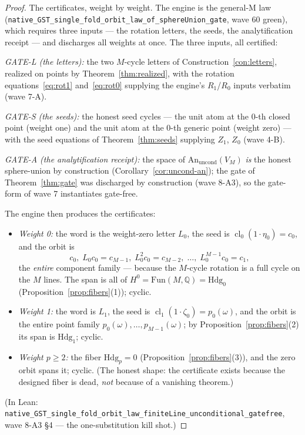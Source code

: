 \documentclass[11pt,a4paper]{article}
\theoremstyle{plain}
\theoremstyle{definition}
\newcommand{\Q}{\mathbb{Q}}
\newcommand{\cl}{\operatorname{cl}}
\begin{document}
\begin{proof}
The certificates, weight by weight.  The engine is the general-M law
(\texttt{native\_GST\_single\_fold\_orbit\_law\_of\_sphereUnion\_gate},
wave 60 green), which requires three inputs --- the rotation letters,
the seeds, the analytification receipt --- and discharges all weights
at once.  The three inputs, all certified:

\emph{GATE-L (the letters):} the two $M$-cycle letters of
Construction~\ref{con:letters}, realized on points by
Theorem~\ref{thm:realized}, with the rotation
equations~\eqref{eq:rot1} and~\eqref{eq:rot0} supplying the engine's
$R_1$/$R_0$ inputs verbatim (wave 7-A).

\emph{GATE-S (the seeds):} the honest seed cycles --- the unit atom
at the $0$-th closed point (weight one) and the unit atom at the
$0$-th generic point (weight zero) --- with the seed equations of
Theorem~\ref{thm:seeds} supplying $Z_1$, $Z_0$ (wave 4-B).

\emph{GATE-A (the analytification receipt):} the space of
$\mathrm{An}_{\mathrm{uncond}}(V_M)$ \emph{is} the honest
sphere-union by construction (Corollary~\ref{cor:uncond-an}); the
gate of Theorem~\ref{thm:gate} was discharged by construction (wave
8-A3), so the gate-form of wave 7 instantiates gate-free.

The engine then produces the certificates:
\begin{itemize}
\item \emph{Weight 0:} the word is the weight-zero letter $L_0$, the
seed is $\cl_0(1\cdot\eta_0) = c_0$, and the orbit is
\[
c_0,\; L_0 c_0 = c_{M-1},\; L_0^2 c_0 = c_{M-2},\;\dots,\;
L_0^{M-1} c_0 = c_1,
\]
the \emph{entire} component family --- because the $M$-cycle
rotation is a full cycle on the $M$ lines.  The span is all of
$H^0 = \mathrm{Fun}(M,\Q) = \mathrm{Hdg}_0$
(Proposition~\ref{prop:fibers}(1)); cyclic.
\item \emph{Weight 1:} the word is $L_1$, the seed is
$\cl_1(1\cdot\zeta_0) = p_0(\omega)$, and the orbit is the entire
point family $p_0(\omega), \dots, p_{M-1}(\omega)$; by
Proposition~\ref{prop:fibers}(2) its span is $\mathrm{Hdg}_1$;
cyclic.
\item \emph{Weight $p \ge 2$:} the fiber $\mathrm{Hdg}_p = 0$
(Proposition~\ref{prop:fibers}(3)), and the zero orbit spans it;
cyclic.  (The honest shape: the certificate exists because the
designed fiber is dead, \emph{not} because of a vanishing theorem.)
\end{itemize}
(In Lean: \texttt{native\_GST\_single\_fold\_orbit\_law\_finiteLine\_unconditional\_gatefree},
wave 8-A3 \S4 --- the one-substitution kill shot.)
\end{proof}
\end{document}
